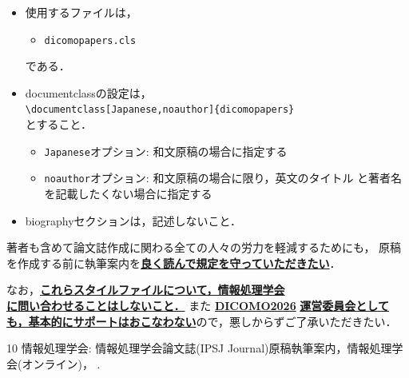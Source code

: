 \documentclass[Japanese]{dicomopapers}
\def\|{\verb|}
\begin{document}
\begin{itemize}%{
  \item 使用するファイルは，
        \begin{itemize}%{
          \item[]\tt dicomopapers.cls
        \end{itemize}%}
        である．
  \item documentclassの設定は，\\
        \|\documentclass[Japanese,noauthor]{dicomopapers}|\\
        とすること．
        \begin{itemize}
          \item {\tt Japanese}オプション: 和文原稿の場合に指定する
          \item {\tt noauthor}オプション: 和文原稿の場合に限り，英文のタイトル
                と著者名を記載したくない場合に指定する
        \end{itemize}
  \item biographyセクションは，記述しないこと．
\end{itemize}%

著者も含めて論文誌作成に関わる全ての人々の労力を軽減するためにも，
原稿を作成する前に執筆案内を\underline{\bf{良く読んで規定を守っていただきたい}}．

なお，\underline{\bf これらスタイルファイルについて，情報処理学会}\\
\underline{\bf に問い合わせることはしないこと．} また
\underline{\bf DICOMO2026}
\underline{\bf 運営委員会としても，基本的にサポートはおこなわない}ので，悪しからずご了承いただきたい．

\begin{thebibliography}{10}
  情報処理学会: 情報処理学会論文誌(IPSJ Journal)原稿執筆案内，情報処理学
  会(オンライン)，
  .
\end{thebibliography}
\end{document}
